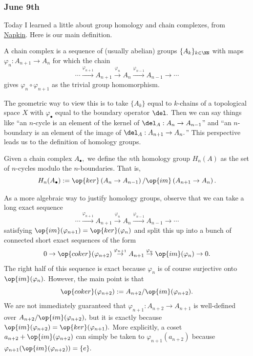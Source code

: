 \subsubsection{June 9th}
Today I learned a little about group homology and chain complexes, from \href{https://web.archive.org/web/20210506095754/https://venhance.github.io/napkin/Napkin.pdf}{Napkin}. Here is our main definition.
\begin{definition}
    A chain complex is a sequence of (usually abelian) groups $\{A_k\}_{k\in\NN}$ with maps $\varphi_n:A_{n+1}\to A_n$ for which the chain
    \[\cdots\stackrel{\varphi_{n+1}}\longrightarrow A_{n+1}\stackrel{\varphi_n}\longrightarrow A_n\stackrel{\varphi_{n-1}}\longrightarrow A_{n-1}\to\cdots\]
    gives $\varphi_n\circ\varphi_{n+1}$ as the trivial group homomorphism.
\end{definition}
The geometric way to view this is to take $\{A_k\}$ equal to $k$-chains of a topological space $X$ with $\varphi_\bullet$ equal to the boundary operator $\del.$ Then we can say things like ``an $n$-cycle is an element of the kernel of $\del_A:A_n\to A_{n-1}$'' and ``an $n$-boundary is an element of the image of $\del_A:A_{n+1}\to A_n.$'' This perspective leads us to the definition of homology groups.
\begin{definition}
    Given a chain complex $A_\bullet,$ we define the $n$th homology group $H_n(A)$ as the set of $n$-cycles modulo the $n$-boundaries. That is,
    \[H_n(A_\bullet):=\op{ker}\left(A_n\to A_{n-1}\right)/\op{im}\left(A_{n+1}\to A_n\right).\]
\end{definition}

As a more algebraic way to justify homology groups, observe that we can take a long exact sequence
\[\cdots\stackrel{\varphi_{n+1}}\longrightarrow A_{n+1}\stackrel{\varphi_n}\longrightarrow A_n\stackrel{\varphi_{n-1}}\longrightarrow A_{n-1}\to\cdots\]
satisfying $\op{im}(\varphi_{n+1})=\op{ker}(\varphi_n)$ and split this up into a bunch of connected short exact sequences of the form
\[0\to\op{coker}(\varphi_{n+2})\stackrel{\varphi_{n+1}}\to A_{n+1}\stackrel{\varphi_n}\to\op{im}(\varphi_n)\to0.\]
The right half of this sequence is exact because $\varphi_n$ is of course surjective onto $\op{im}(\varphi_n).$ However, the main point is that
\[\op{coker}(\varphi_{n+2}):=A_{n+2}/\op{im}(\varphi_{n+2}).\]
We are not immediately guaranteed that $\varphi_{n+1}:A_{n+2}\to A_{n+1}$ is well-defined over $A_{n+2}/\op{im}(\varphi_{n+2}),$ but it is exactly because $\op{im}(\varphi_{n+2})=\op{ker}(\varphi_{n+1}).$ More explicitly, a coset $a_{n+2}+\op{im}(\varphi_{n+2})$ can simply be taken to $\varphi_{n+1}(a_{n+2})$ because $\varphi_{n+1}(\op{im}(\varphi_{n+2}))=\{e\}.$

